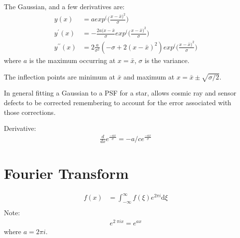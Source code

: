 \documentclass[letterpaper,10pt,english,openany,oneside]{sphinxmanual}
\begin{document}
\sphinxAtStartPar
The Gaussian, and a few derivatives are:
\begin{equation}\label{equation:mathematics:Gaussian1}
\begin{split} y(x) &= a exp^\Big(  (\frac{x-\bar{x})^{2}}{\sigma}  \Big) \\
 y^{\prime}(x) &= -\frac{2a(x-\bar{x}}{\sigma}exp^\Big(  (\frac{x-\bar{x})^{2}}{\sigma}  \Big) \\
 y^{\prime\prime}(x) &= 2\frac{a}{\sigma^{2}} \left(-\sigma + 2(x-\bar{x})^{2} \right) exp^\Big(  (\frac{x-\bar{x})^{2}}{\sigma}  \Big)\end{split}
\end{equation}
\sphinxAtStartPar
where \(a\) is the maximum occurring at \(x = \bar{x}\), \(\sigma\) is
the variance.

\sphinxAtStartPar
The inflection points are minimum at \(\bar{x}\) and
maximum at \(x=\bar{x}\pm\sqrt{\sigma/2}\).

\sphinxAtStartPar
In general fitting a Gaussian to a PSF for a star, allows cosmic ray
and sensor defects to be corrected \textendash{} remembering to account for the
error associated with those corrections.

\sphinxAtStartPar
Derivative:
\begin{equation}\label{equation:mathematics:GaussianDerivative}
\begin{split}\frac{d}{dx} e^{\frac{-ax}{\sigma}}  =  -a/c e^{\frac{-ax}{\sigma}}\end{split}
\end{equation}

\section{Fourier Transform}
\label{\detokenize{mathematics:fourier-transform}}\begin{equation}\label{equation:mathematics:Fourier1}
\begin{split}f(x) &= \int_{-\infty}^{\infty} f(\xi) e^{2 \pi i} \textrm{d}\xi\\\end{split}
\end{equation}
\sphinxAtStartPar
Note:
\begin{equation}\label{equation:mathematics:Fourier2}
\begin{split}e^{2\; \pi i x} = e^{ax}\end{split}
\end{equation}
\sphinxAtStartPar
where \(a = 2 \pi i\).
\end{document}
